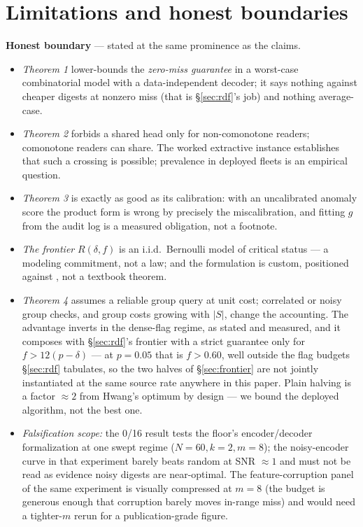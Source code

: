 \documentclass[11pt,a4paper]{article}
\begin{document}
\section{Limitations and honest boundaries}\label{sec:limits}
\begin{boundary}
\textbf{Honest boundary} --- stated at the same prominence as the claims.
\begin{itemize}[leftmargin=1.6em]
\item \emph{Theorem 1} lower-bounds the \emph{zero-miss guarantee} in a worst-case combinatorial model with a data-independent decoder; it says nothing against cheaper digests at nonzero miss (that is \S\ref{sec:rdf}'s job) and nothing average-case.
\item \emph{Theorem 2} forbids a shared head only for non-comonotone readers; comonotone readers can share. The worked extractive instance establishes that such a crossing is possible; prevalence in deployed fleets is an empirical question.
\item \emph{Theorem 3} is exactly as good as its calibration: with an uncalibrated anomaly score the product form is wrong by precisely the miscalibration, and fitting $g$ from the audit log is a measured obligation, not a footnote.
\item \emph{The frontier} $R(\delta,f)$ is an i.i.d.\ Bernoulli model of critical status --- a modeling commitment, not a law; and the formulation is custom, positioned against \cite{expansion,rdc}, not a textbook theorem.
\item \emph{Theorem 4} assumes a reliable group query at unit cost; correlated or noisy group checks, and group costs growing with $|S|$, change the accounting. The advantage inverts in the dense-flag regime, as stated and measured, and it composes with \S\ref{sec:rdf}'s frontier with a strict guarantee only for $f>12(p-\delta)$ --- at $p{=}0.05$ that is $f>0.60$, well outside the flag budgets \S\ref{sec:rdf} tabulates, so the two halves of \S\ref{sec:frontier} are not jointly instantiated at the same source rate anywhere in this paper. Plain halving is a factor $\approx2$ from Hwang's optimum by design --- we bound the deployed algorithm, not the best one.
\item \emph{Falsification scope:} the 0/16 result tests the floor's encoder/decoder formalization at one swept regime ($N{=}60,k{=}2,m{=}8$); the noisy-encoder curve in that experiment barely beats random at SNR $\approx1$ and must not be read as evidence noisy digests are near-optimal. The feature-corruption panel of the same experiment is visually compressed at $m{=}8$ (the budget is generous enough that corruption barely moves in-range miss) and would need a tighter-$m$ rerun for a publication-grade figure.
\end{itemize}
\end{boundary}
\end{document}
